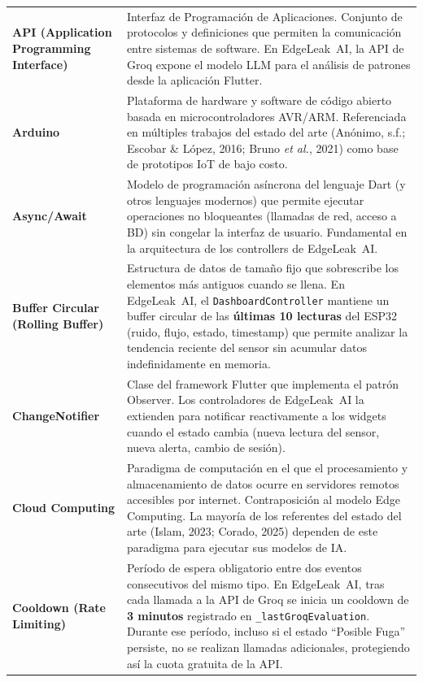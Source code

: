 \documentclass[12pt,a4paper]{article}
\begin{document}
\begin{longtable}{>{\bfseries}p{3.8cm} p{10.5cm}}
API (Application Programming Interface) & Interfaz de Programación de Aplicaciones.
Conjunto de protocolos y definiciones que permiten la comunicación entre sistemas de
software. En EdgeLeak~AI, la API de Groq expone el modelo LLM para el análisis de
patrones desde la aplicación Flutter.
\\[0.5em]

Arduino & Plataforma de hardware y software de código abierto basada en microcontroladores
AVR/ARM. Referenciada en múltiples trabajos del estado del arte (Anónimo, s.f.; Escobar
\& López, 2016; Bruno \textit{et al.}, 2021) como base de prototipos IoT de bajo costo.
\\[0.5em]

Async/Await & Modelo de programación asíncrona del lenguaje Dart (y otros lenguajes
modernos) que permite ejecutar operaciones no bloqueantes (llamadas de red, acceso a
BD) sin congelar la interfaz de usuario. Fundamental en la arquitectura de los
controllers de EdgeLeak~AI.
\\[0.5em]

Buffer Circular (Rolling Buffer) & Estructura de datos de tamaño fijo que sobrescribe
los elementos más antiguos cuando se llena. En EdgeLeak~AI, el
\texttt{DashboardController} mantiene un buffer circular de las \textbf{últimas 10
lecturas} del ESP32 (ruido, flujo, estado, timestamp) que permite analizar la tendencia
reciente del sensor sin acumular datos indefinidamente en memoria.
\\[0.5em]

ChangeNotifier & Clase del framework Flutter que implementa el patrón Observer. Los
controladores de EdgeLeak~AI la extienden para notificar reactivamente a los widgets
cuando el estado cambia (nueva lectura del sensor, nueva alerta, cambio de sesión).
\\[0.5em]

Cloud Computing & Paradigma de computación en el que el procesamiento y almacenamiento
de datos ocurre en servidores remotos accesibles por internet. Contraposición al modelo
Edge Computing. La mayoría de los referentes del estado del arte (Islam, 2023; Corado,
2025) dependen de este paradigma para ejecutar sus modelos de IA.
\\[0.5em]

Cooldown (Rate Limiting) & Período de espera obligatorio entre dos eventos consecutivos
del mismo tipo. En EdgeLeak~AI, tras cada llamada a la API de Groq se inicia un cooldown
de \textbf{3 minutos} registrado en \texttt{\_lastGroqEvaluation}. Durante ese período,
incluso si el estado ``Posible Fuga'' persiste, no se realizan llamadas adicionales,
protegiendo así la cuota gratuita de la API.
\\[0.5em]


\end{longtable}
\end{document}
